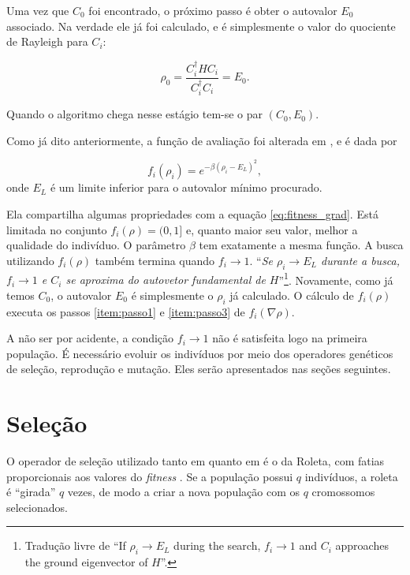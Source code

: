 	Uma vez que $C_0$ foi encontrado, o próximo passo é obter o autovalor $E_0$ associado. Na verdade ele já foi calculado, e é simplesmente o valor do quociente de Rayleigh para $C_i$:
	
	\begin{equation}
		\rho_0 = \frac{C_i^{\dagger} H C_i}{C_i^{\dagger} C_i} = E_0.
	\end{equation}
	
	Quando o algoritmo chega nesse estágio tem-se o par $(C_0,E_0)$.
	
	Como já dito anteriormente, a função de avaliação foi alterada em \cite{metodo2011}, e é dada por 
	
	\begin{equation}\label{eq:fitness_EL_metodo}
		f_i(\rho_i) = e^{-\beta(\rho_i - E_L)^2},
	\end{equation}
	onde $E_L$ é um limite inferior para o autovalor mínimo procurado.
	
	Ela compartilha algumas propriedades com a equação \ref{eq:fitness_grad}. Está limitada no conjunto $f_i(\rho) = (0,1]$ e, quanto maior seu valor, melhor a qualidade do indivíduo. O parâmetro $\beta$ tem exatamente a mesma função. A busca utilizando $f_i(\rho)$ também termina quando $f_i \rightarrow 1$. ``\emph{Se $\rho_i \rightarrow E_L$ durante a busca, $f_i \rightarrow 1$ e $C_i$ se aproxima do autovetor fundamental de $H$}''\footnote{Tradução livre de ``If $\rho_i \rightarrow E_L$ during the search, $f_i \rightarrow 1$ and $C_i$ approaches the ground eigenvector of $H$''.}. Novamente, como já temos $C_0$, o autovalor $E_0$ é simplesmente o $\rho_i$ já calculado.	O cálculo de $f_i(\rho)$ executa os passos \ref{item:passo1} e \ref{item:passo3} de $f_i(\nabla\rho)$.
				
		A não ser por acidente, a condição $f_i \rightarrow 1$ não é satisfeita logo na primeira população. É necessário evoluir os indivíduos por meio dos operadores genéticos de seleção, reprodução e mutação. Eles serão apresentados nas seções seguintes.

\section{Seleção}

			O operador de seleção utilizado tanto em \cite{metodo2004} quanto em \cite{metodo2011} é o da Roleta, com fatias proporcionais aos valores do \emph{fitness} \cite{Linden2008}. Se a população possui $q$ indivíduos, a roleta é ``girada'' $q$ vezes, de modo a criar a nova população com os $q$ cromossomos selecionados.
			
